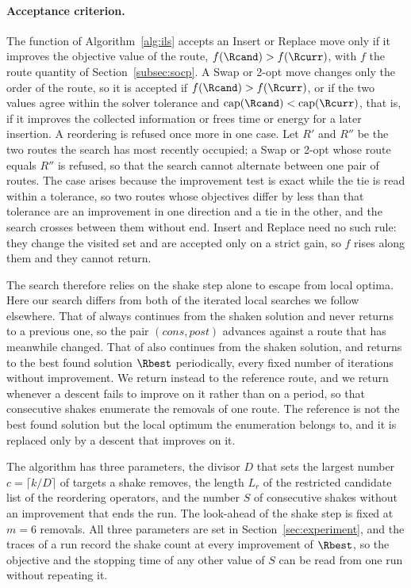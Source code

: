 \paragraph{Acceptance criterion.}
The function \FAccept{$\Rcand, \Rcurr$} of Algorithm~\ref{alg:ils} accepts an Insert or Replace move only if it improves the objective value of the route, $f(\Rcand) > f(\Rcurr)$, with $f$ the route quantity of Section~\ref{subsec:socp}. A Swap or 2-opt move changes only the order of the route, so it is accepted if $f(\Rcand) > f(\Rcurr)$, or if the two values agree within the solver tolerance and $\mathrm{cap}(\Rcand) < \mathrm{cap}(\Rcurr)$, that is, if it improves the collected information or frees time or energy for a later insertion. A reordering is refused once more in one case. Let $R'$ and $R''$ be the two routes the search has most recently occupied; a Swap or 2-opt whose route equals $R''$ is refused, so that the search cannot alternate between one pair of routes. The case arises because the improvement test is exact while the tie is read within a tolerance, so two routes whose objectives differ by less than that tolerance are an improvement in one direction and a tie in the other, and the search crosses between them without end. Insert and Replace need no such rule: they change the visited set and are accepted only on a strict gain, so $f$ rises along them and they cannot return.

The search therefore relies on the shake step alone to escape from local optima. Here our search differs from both of the iterated local searches we follow elsewhere. That of \citep{vansteenwegen2009iterated} always continues from the shaken solution and never returns to a previous one, so the pair $(\mathit{cons}, \mathit{post})$ advances against a route that has meanwhile changed. That of \citep{gunawan2015iterated} also continues from the shaken solution, and returns to the best found solution $\Rbest$ periodically, every fixed number of iterations without improvement. We return instead to the reference route, and we return whenever a descent fails to improve on it rather than on a period, so that consecutive shakes enumerate the removals of one route. The reference is not the best found solution but the local optimum the enumeration belongs to, and it is replaced only by a descent that improves on it.

The algorithm has three parameters, the divisor $D$ that sets the largest number $c = \lceil k / D \rceil$ of targets a shake removes, the length $L_r$ of the restricted candidate list of the reordering operators, and the number $S$ of consecutive shakes without an improvement that ends the run. The look-ahead of the shake step is fixed at $m = 6$ removals. All three parameters are set in Section~\ref{sec:experiment}, and the traces of a run record the shake count at every improvement of $\Rbest$, so the objective and the stopping time of any other value of $S$ can be read from one run without repeating it.

